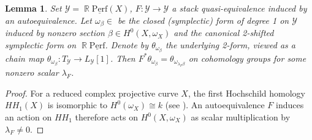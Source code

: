 \documentclass[reqno]{amsart}
\DeclareMathOperator\R{\mathbb R}
\newtheorem{lemma}[theorem]{Lemma}
\theoremstyle{definition}
\theoremstyle{remark}
\newcommand{\ul}{\underline}
\newcommand{\uperf}{\ul{\mathrm{Perf}}}
\newcommand{\sY}{\mathscr{Y}}
\numberwithin{equation}{section}
\begin{document}
\begin{lemma} 
Set $\sY=\R\uperf(X)$, $F:\sY\to \sY$ a stack quasi-equivalence induced by an autoequivalence. Let $\omega_\beta\in $ be the closed (symplectic) form of degree 1 on $\sY$ induced by nonzero section $\beta\in H^0(X,\omega_X)$ and the canonical 2-shifted symplectic form on $\R\uperf$. Denote by $\theta_{\omega_\beta}$ the underlying 2-form, viewed as a chain map $\theta_{\omega_\beta}: T_\sY\to L_\sY[1]$. Then $F^*\theta_{\omega_\beta}= \theta_{\omega_{\lambda_F\beta}}$ on cohomology groups for some nonzero scalar $\lambda_F$.
\end{lemma}
\begin{proof}
For a reduced complex projective curve $X$, the first Hochschild homology $HH_1(X)$ is isomorphic to $H^0(\omega_X)\cong k$ (see \cite[Example 1.6]{Weibel97}). An autoequivalence $F$ induces an action on $HH_1$ therefore acts on $H^0(X,\omega_X)$ as scalar multiplication by $\lambda_F\neq 0$.  







\end{proof}
\end{document}
